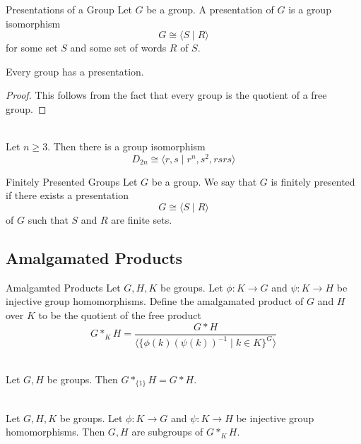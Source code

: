 \documentclass[a4paper]{article}
\begin{document}
\begin{defn}{Presentations of a Group}{} Let $G$ be a group. A presentation of $G$ is a group isomorphism $$G\cong\langle S\;|\;R\rangle$$ for some set $S$ and some set of words $R$ of $S$. 
\end{defn}

\begin{prp}{}{} Every group has a presentation. 
\begin{proof}
This follows from the fact that every group is the quotient of a free group. 
\end{proof}
\end{prp}

\begin{eg}{}{}\\
Let $n\geq 3$. Then there is a group isomorphism $$D_{2n}\cong\langle r,s\;|\;r^n, s^2, rsrs\rangle$$
\end{eg}

\begin{defn}{Finitely Presented Groups}{} Let $G$ be a group. We say that $G$ is finitely presented if there exists a presentation $$G\cong\langle S\;|\;R\rangle$$ of $G$ such that $S$ and $R$ are finite sets. 
\end{defn}

\subsection{Amalgamated Products}
\begin{defn}{Amalgamted Products}{} Let $G,H,K$ be groups. Let $\phi:K\to G$ and $\psi:K\to H$ be injective group homomorphisms. Define the amalgamated product of $G$ and $H$ over $K$ to be the quotient of the free product $$G\ast_KH=\frac{G\ast H}{\langle\{\phi(k)(\psi(k))^{-1}\;|\;k\in K\}^G\rangle}$$
\end{defn}

\begin{eg}{}{}\\
Let $G,H$ be groups. Then $G\ast_{\{1\}} H=G\ast H$. 
\end{eg}

\begin{lmm}{}{}\\
Let $G,H,K$ be groups. Let $\phi:K\to G$ and $\psi:K\to H$ be injective group homomorphisms. Then $G,H$ are subgroups of $G\ast_KH$. 
\end{lmm}
\end{document}
